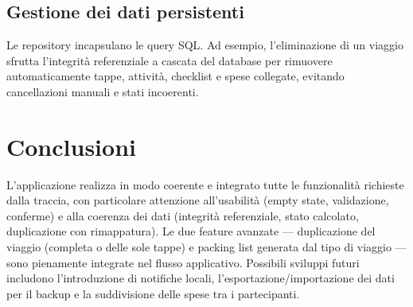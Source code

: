 \documentclass[11pt, a4paper]{article}
\begin{document}
\subsection{Gestione dei dati persistenti}
Le repository incapsulano le query SQL. Ad esempio, l'eliminazione di un viaggio sfrutta
l'integrità referenziale a cascata del database per rimuovere automaticamente tappe,
attività, checklist e spese collegate, evitando cancellazioni manuali e stati
incoerenti.

\section{Conclusioni}
L'applicazione realizza in modo coerente e integrato tutte le funzionalità richieste
dalla traccia, con particolare attenzione all'usabilità (empty state, validazione,
conferme) e alla coerenza dei dati (integrità referenziale, stato calcolato,
duplicazione con rimappatura). Le due feature avanzate --- duplicazione del viaggio
(completa o delle sole tappe) e packing list generata dal tipo di viaggio --- sono
pienamente integrate nel flusso applicativo. Possibili sviluppi futuri includono l'introduzione di notifiche
locali, l'esportazione/importazione dei dati per il backup e la suddivisione delle spese
tra i partecipanti.
\end{document}
